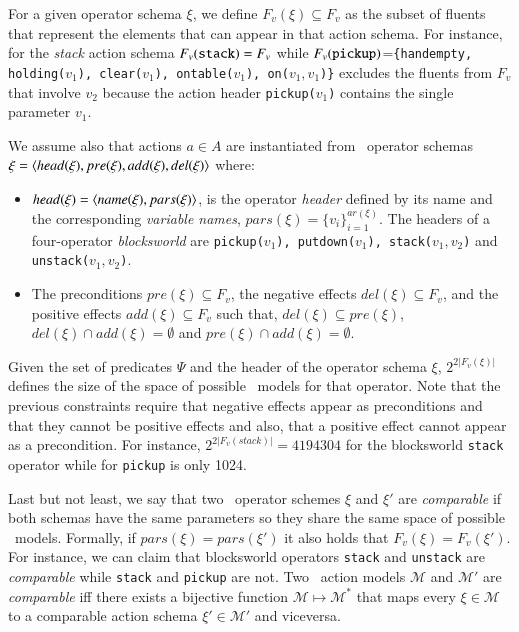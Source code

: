 For a given operator schema $\xi$, we define $F_v(\xi)\subseteq F_v$ as the subset of fluents that represent the elements that can appear in that action schema. For instance, for the {\em stack} action schema $F_v({\tt stack})=F_v$ while $F_v({\tt pickup})$={\small\tt\{handempty, holding($v_1$), clear($v_1$), ontable($v_1$), on($v_1,v_1$)\}} excludes the fluents from $F_v$ that involve $v_2$ because the action header {\small\tt pickup($v_1$)} contains the single parameter $v_1$.

We assume also that actions $a\in A$ are instantiated from \strips\ operator schemas $\xi={\langle head(\xi),pre(\xi),add(\xi),del(\xi) \rangle}$ where:
\begin{itemize}
\item $head(\xi)={\langle name(\xi),pars(\xi) \rangle}$, is the operator {\em header} defined by its name and the corresponding {\em variable names}, $pars(\xi)=\{v_i\}_{i=1}^{ar(\xi)}$. The headers of a four-operator {\em blocksworld} are {\small\tt pickup($v_1$), putdown($v_1$), stack($v_1,v_2$)} and {\small\tt unstack($v_1,v_2$)}.
\item The preconditions $pre(\xi)\subseteq F_v$, the negative effects $del(\xi)\subseteq F_v$, and the positive effects $add(\xi)\subseteq F_v$ such that, $del(\xi)\subseteq pre(\xi)$, $del(\xi)\cap add(\xi)=\emptyset$ and $pre(\xi)\cap add(\xi)=\emptyset$.
\end{itemize}
Given the set of predicates $\Psi$ and the header of the operator schema $\xi$, $2^{2|F_v(\xi)|}$ defines the size of the space of possible \strips\ models for that operator. Note that the previous constraints require that negative effects appear as preconditions and that they cannot be positive effects and also, that a positive effect cannot appear as a precondition. For instance, $2^{2|F_v(stack)|}=4194304$ for the blocksworld {\tt stack} operator while for {\tt pickup} is only 1024.

Last but not least, we say that two \strips\ operator schemes $\xi$ and $\xi'$ are {\em comparable} if both schemas have the same parameters so they share the same space of possible \strips\ models. Formally, if $pars(\xi)=pars(\xi')$ it also holds that $F_v(\xi)=F_v(\xi')$. For instance, we can claim that blocksworld operators {\tt stack} and {\tt unstack} are {\em comparable} while  {\tt stack} and {\tt pickup} are not. Two \strips\ action models $\mathcal{M}$ and $\mathcal{M}'$ are {\em comparable} iff there exists a bijective function $\mathcal{M} \mapsto \mathcal{M}^*$ that maps every $\xi\in\mathcal{M}$ to a comparable action schema $\xi'\in\mathcal{M'}$ and viceversa.


